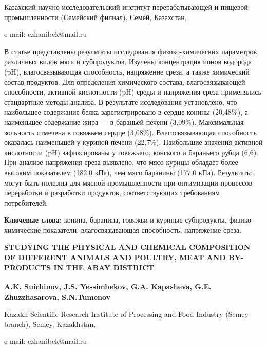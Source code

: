\begin{affiliation}
Казахский научно-исследовательский институт перерабатывающей и пищевой промышленности (Семейский филиал), Семей, Казахстан,

e-mail: ezhanibek@mail.ru
\end{affiliation}

В статье представлены результаты исследования физико-химических
параметров различных видов мяса и субпродуктов. Изучены концентрация
ионов водорода (pH), влагосвязывающая способность, напряжение среза, а
также химический состав продуктов. Для определения химического состава,
влагосвязывающей способности, активной кислотности (pH) среды и
напряжения среза применялись стандартные методы анализа. В результате
исследования установлено, что наибольшее содержание белка
зарегистрировано в сердце конины (20,48\%), а наименьшее содержание жира
--- в бараньей печени (3,09\%). Максимальная зольность отмечена в
говяжьем сердце (3,08\%). Влагосвязывающая способность оказалась
наименьшей у куриной печени (22,7\%). Наибольшие значения активной
кислотности (pH) зафиксированы у говяжьего, конского и бараньего рубца
(6,6). При анализе напряжения среза выявлено, что мясо курицы обладает
более высоким показателем (182,0 кПа), чем мясо баранины (177,0 кПа).
Результаты могут быть полезны для мясной промышленности при оптимизации
процессов переработки и разработки продуктов, соответствующих
требованиям потребителей.

{\bfseries Ключевые слова:} конина, баранина, говяжьи и куриные
субпродукты, физико-химические показатели, влагосвязывающая способность,
напряжение среза.

\begin{articleheader}
{\bfseries STUDYING THE PHYSICAL AND CHEMICAL COMPOSITION OF DIFFERENT
ANIMALS AND POULTRY, MEAT AND BY-PRODUCTS IN THE ABAY DISTRICT}

{\bfseries
A.K. Suichinov,
J.S. Yessimbekov\textsuperscript{\envelope },
G.A. Kapasheva,
G.E. Zhuzzhasarova,
S.N.Tumenov
}
\end{articleheader}

\begin{affiliation}
Kazakh Scientific Research Institute of Processing and Food Industry (Semey branch), Semey, Kazakhstan,

e-mail: ezhanibek@mail.ru
\end{affiliation}


